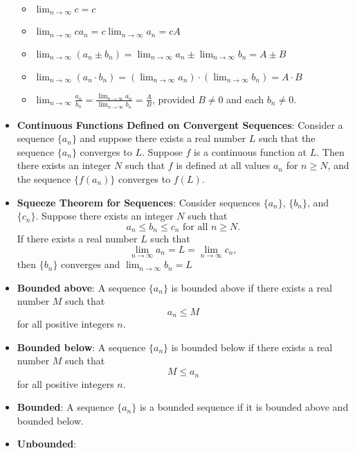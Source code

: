 \documentclass{report}
\begin{document}
\begin{itemize}
          \begin{itemize}
            \item \( \lim_{{n \to \infty}} c = c \)
            \item \( \lim_{{n \to \infty}} c a_n = c \lim_{{n \to \infty}} a_n = cA \)
            \item \( \lim_{{n \to \infty}} (a_n \pm b_n) = \lim_{{n \to \infty}} a_n \pm \lim_{{n \to \infty}} b_n = A \pm B \)
            \item \( \lim_{{n \to \infty}} (a_n \cdot b_n) = (\lim_{{n \to \infty}} a_n) \cdot (\lim_{{n \to \infty}} b_n) = A \cdot B \)
            \item \( \lim_{{n \to \infty}} \frac{a_n}{b_n} = \frac{\lim_{{n \to \infty}} a_n}{\lim_{{n \to \infty}} b_n} = \frac{A}{B} \), provided \( B \neq 0 \) and each \( b_n \neq 0 \).
        \end{itemize}
    \item \textbf{Continuous Functions Defined on Convergent Sequences}:
          Consider a sequence \( \{a_n\} \) and suppose there exists a real number \( L \) such that the sequence \( \{a_n\} \) converges to \( L \). Suppose \( f \) is a continuous function at \( L \). Then there exists an integer \( N \) such that \( f \) is defined at all values \( a_n \) for \( n \geq N \), and the sequence \( \{f(a_n)\} \) converges to \( f(L) \).
    \item \textbf{Squeeze Theorem for Sequences}:           Consider sequences \( \{a_n\} \), \( \{b_n\} \), and \( \{c_n\} \). Suppose there exists an integer \( N \) such that
        \[ a_n \leq b_n \leq c_n \text{ for all } n \geq N. \]
        If there exists a real number \( L \) such that
        \[ \lim_{{n \to \infty}} a_n = L = \lim_{{n \to \infty}} c_n, \]
        then \( \{b_n\} \) converges and \( \lim_{{n \to \infty}} b_n = L \)
    \item \textbf{Bounded above}:           A sequence \( \{a_n\} \) is bounded above if there exists a real number \( M \) such that
        \[ a_n \leq M \]
        for all positive integers \( n \).
    \item \textbf{Bounded below}:
        A sequence \( \{a_n\} \) is bounded below if there exists a real number \( M \) such that
        \[ M \leq a_n \]
        for all positive integers \( n \).
    \item \textbf{Bounded}:
        A sequence \( \{a_n\} \) is a bounded sequence if it is bounded above and bounded below. 
    \item \textbf{Unbounded}:

\end{itemize}
\end{document}
